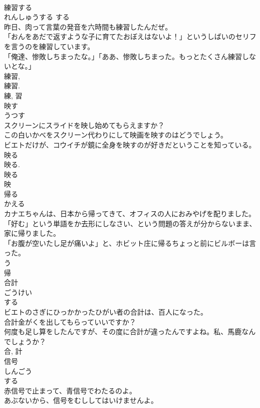 \documentclass[8pt]{extreport}
\begin{document}
\begin{CJK}{UTF8}{min}
\\	練習する	
\\	れんしゅうする	する 
\\	昨日、肉って言葉の発音を六時間も練習したんだぜ。	
\\	「おんをあだで返すような子に育てたおぼえはないよ！」というしばいのセリフを言うのを練習しています。	
\\	「俺達、惨敗しちまったな。」「ああ、惨敗しちまった。もっとたくさん練習しないとな。」	
\\	練習, 
\\	練習. 
\\	練, 習	
\\	映す	
\\	うつす	
\\	スクリーンにスライドを映し始めてもらえますか？	
\\	この白いかべをスクリーン代わりにして映画を映すのはどうでしょう。	
\\	ビエトだけが、コウイチが鏡に全身を映すのが好きだということを知っている。	
\\	映る 
\\	映る. 
\\	映る 
\\	映	
\\	帰る	
\\	かえる	
\\	カナエちゃんは、日本から帰ってきて、オフィスの人におみやげを配りました。	
\\	「好む」という単語をか去形にしなさい、という問題の答えが分からないまま、家に帰りました。	
\\	「お腹が空いたし足が痛いよ」と、ホビット庄に帰るちょっと前にビルボーは言った。	
\\	う 
\\	帰	
\\	合計	
\\	ごうけい	
\\	する 
\\	ビエトのさぎにひっかかったひがい者の合計は、百人になった。	
\\	合計金がくを出してもらっていいですか？	
\\	何度も足し算をしたんですが、その度に合計が違ったんですよね。私、馬鹿なんでしょうか？	
\\	合, 計	
\\	信号	
\\	しんごう	
\\	する 
\\	赤信号で止まって、青信号でわたるのよ。	
\\	あぶないから、信号をむししてはいけませんよ。	

\end{CJK}
\end{document}
